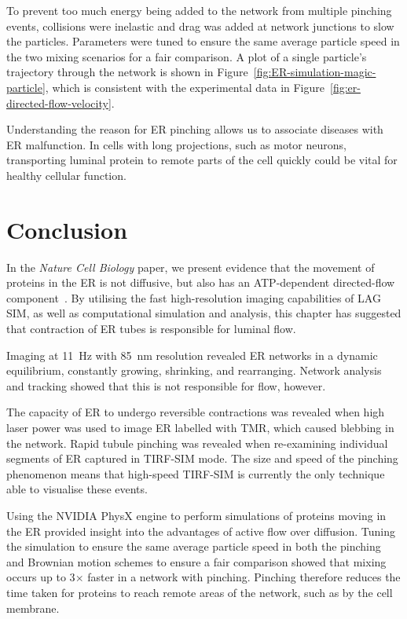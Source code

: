 To prevent too much energy being added to the network from multiple pinching events, collisions were inelastic and drag was added at network junctions to slow the particles. 
Parameters were tuned to ensure the same average particle speed in the two mixing scenarios for a fair comparison. 
A plot of a single particle's trajectory through the network is shown in Figure~\ref{fig:ER-simulation-magic-particle}, which is consistent with the experimental data in Figure~\ref{fig:er-directed-flow-velocity}. 

Understanding the reason for ER pinching allows us to associate diseases with ER malfunction. 
In cells with long projections, such as motor neurons, transporting luminal protein to remote parts of the cell quickly could be vital for healthy cellular function. 

\section{Conclusion} 
In the \textit{Nature Cell Biology} paper, we present evidence that the movement of proteins in the ER is not diffusive, but also has an ATP-dependent directed-flow component~\cite{holcman2018single}.
By utilising the fast high-resolution imaging capabilities of LAG SIM, as well as computational simulation and analysis, this chapter has suggested that contraction of ER tubes is responsible for luminal flow. 

Imaging at \SI{11}{\hertz} with \SI{85}{\nano\metre} resolution revealed ER networks in a dynamic equilibrium, constantly growing, shrinking, and rearranging. 
Network analysis and tracking showed that this is not responsible for flow, however.

The capacity of ER to undergo reversible contractions was revealed when high laser power was used to image ER labelled with TMR, which caused blebbing in the network.
Rapid tubule pinching was revealed when re-examining individual segments of ER captured in TIRF-SIM mode. 
The size and speed of the pinching phenomenon means that high-speed TIRF-SIM is currently the only technique able to visualise these events. 

Using the NVIDIA PhysX engine to perform simulations of proteins moving in the ER provided insight into the advantages of active flow over diffusion.
Tuning the simulation to ensure the same average particle speed in both the pinching and Brownian motion schemes to ensure a fair comparison showed that mixing occurs up to 3$\times$ faster in a network with pinching.
Pinching therefore reduces the time taken for proteins to reach remote areas of the network, such as by the cell membrane. 

